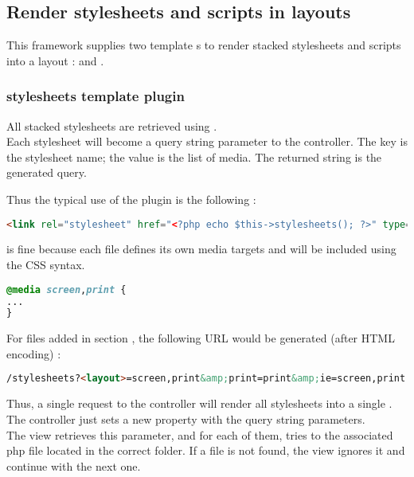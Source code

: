 \documentclass[pdftex,12pt,a4paper]{article}
\begin{document}
\subsection{Render stylesheets and scripts in layouts}

This framework supplies two template s to render stacked stylesheets and scripts into a layout :  and .

\subsubsection{stylesheets template plugin}

All stacked stylesheets are retrieved using .\\
Each stylesheet will become a query string parameter to the  controller. The key is the stylesheet name; the value is the list of media.
The returned string is the generated query.

Thus the typical use of the plugin is the following :
\begin{lstlisting}[language=HTML]
<link rel="stylesheet" href="<?php echo $this->stylesheets(); ?>" type="text/css" media="all" />
\end{lstlisting}
 is fine because each file defines its own media targets and will be included using the CSS syntax.
\begin{lstlisting}[language=CSS]
@media screen,print {
...
}
\end{lstlisting}

For files added in section , the following URL would be generated (after HTML encoding) :\\
\begin{lstlisting}[language=HTML]
/stylesheets?<layout>=screen,print&amp;print=print&amp;ie=screen,print
\end{lstlisting}

Thus, a single request to the  controller will render all stylesheets into a single .\\
The controller just sets a new  property with the query string parameters.\\
The view retrieves this parameter, and for each of them, tries to  the associated php file located in the correct folder.
If a file is not found, the view ignores it and continue with the next one.
\end{document}
